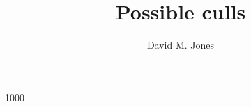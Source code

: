 \documentclass{article}
\newif\ifsmall
\begin{document}

\ifsmall
    \fontsize{7.5pt}{9pt}
\fi

\selectfont

\title{Possible culls}
\author{David M. Jones}

\maketitle

\nocite{Adams1996b}
\nocite{Aveni1994}
\nocite{Barnes1989}
\nocite{Bolles2002}
\nocite{Boucher1969}
\nocite{Cable1994}
\nocite{Chesterton1988}
\nocite{ChristiansenT1998}
\nocite{Friedl1997}
\nocite{Hearn2002a}
\nocite{Kiernan2001}
\nocite{Lansdale1991}
\nocite{Larson1990}
\nocite{Lewis1993}
\nocite{McCarthy1995}
\nocite{OBrien2001}
\nocite{Pamuk2001}
\nocite{Rankin1990}
\nocite{Raymond1991}
\nocite{Rolston1991}
\nocite{Stein1998}
\nocite{Tan1989a}
\nocite{Tepper1989b}



\begin{thebibliography}{1000}

\end{thebibliography}
\end{document}
